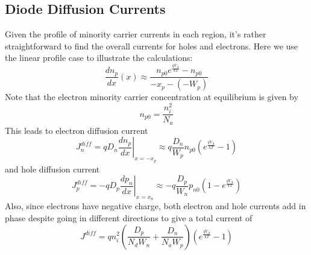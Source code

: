 \subsection{Diode Diffusion Currents}
Given the profile of minority carrier currents in each region, it's rather straightforward to find the overall currents for holes and electrons.  Here we use the linear profile case to illustrate the calculations:
\begin{equation}
	\frac{{d{n_p}}}{{dx}}(x) \approx \frac{{{n_{p0}}{e^{\frac{{q{V_A}}}{{kT}}}} - {n_{p0}}}}{{ - {x_p} - ( - {W_p})}}
\end{equation}
Note that the electron minority carrier concentration at equilibrium is given by
\begin{equation}
	{n_{p0}} = \frac{{n_i^2}}{{{N_a}}}
\end{equation}
This leads to electron diffusion current
\begin{equation}
	J_n^{diff} = q{D_n}{\left. {\frac{{d{n_p}}}{{dx}}} \right|_{x =  - {x_p}}} \approx q\frac{{{D_n}}}{{{W_p}}}{n_{p0}}\left( {{e^{\frac{{q{V_A}}}{{kT}}}} - 1} \right)
\end{equation}
and hole diffusion current
\begin{equation}
	J_p^{diff} =  - q{D_p}{\left. {\frac{{d{p_n}}}{{dx}}} \right|_{x = {x_n}}} \approx  - q\frac{{{D_p}}}{{{W_n}}}{p_{n0}}\left( {1 - {e^{\frac{{q{V_A}}}{{kT}}}}} \right)
\end{equation}
Also, since electrons have negative charge, both electron and hole currents add in phase despite going in different directions to give a total current of
\begin{equation}
	J_{}^{diff} = qn_i^2\left( {\frac{{{D_p}}}{{{N_d}{W_n}}} + \frac{{{D_n}}}{{{N_a}{W_p}}}} \right)\left( {{e^{\frac{{q{V_A}}}{{kT}}}} - 1} \right)
\end{equation}
